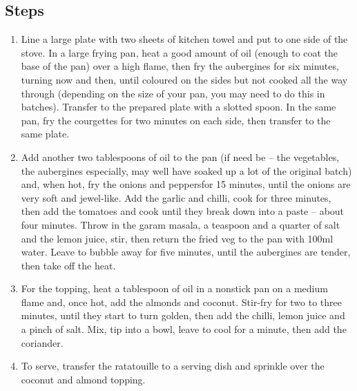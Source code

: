 \documentclass{book}
\begin{document}
\subsection*{Steps}
\begin{enumerate}
\item Line a large plate with two sheets of kitchen towel and put to one side of the stove. In a large frying pan, heat a good amount of oil (enough to coat the base of the pan) over a high flame, then fry the aubergines for six minutes, turning now and then, until coloured on the sides but not cooked all the way through (depending on the size of your pan, you may need to do this in batches). Transfer to the prepared plate with a slotted spoon. In the same pan, fry the courgettes for two minutes on each side, then transfer to the same plate.
\item Add another two tablespoons of oil to the pan (if need be – the vegetables, the aubergines especially, may well have soaked up a lot of the original batch) and, when hot, fry the onions and peppersfor 15 minutes, until the onions are very soft and jewel-like. Add the garlic and chilli, cook for three minutes, then add the tomatoes and cook until they break down into a paste – about four minutes. Throw in the garam masala, a teaspoon and a quarter of salt and the lemon juice, stir, then return the fried veg to the pan with 100ml water. Leave to bubble away for five minutes, until the aubergines are tender, then take off the heat.
\item For the topping, heat a tablespoon of oil in a nonstick pan on a medium flame and, once hot, add the almonds and coconut. Stir-fry for two to three minutes, until they start to turn golden, then add the chilli, lemon juice and a pinch of salt. Mix, tip into a bowl, leave to cool for a minute, then add the coriander.
\item To serve, transfer the ratatouille to a serving dish and sprinkle over the coconut and almond topping.
\end{enumerate}
\newpage
\end{document}

